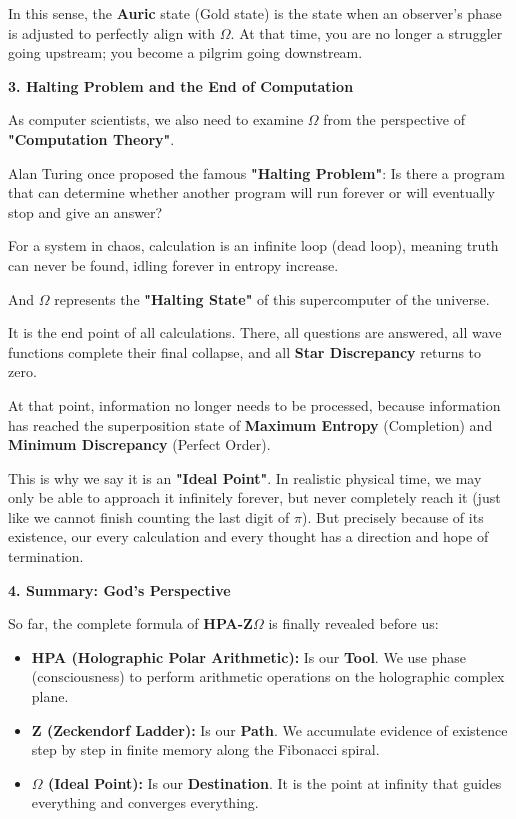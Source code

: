 In this sense, the \textbf{Auric} state (Gold state) is the state when an observer's phase is adjusted to perfectly align with \textbf{$\Omega$}. At that time, you are no longer a struggler going upstream; you become a pilgrim going downstream.

\textbf{3. Halting Problem and the End of Computation}

As computer scientists, we also need to examine \textbf{$\Omega$} from the perspective of \textbf{"Computation Theory"}.

Alan Turing once proposed the famous \textbf{"Halting Problem"}: Is there a program that can determine whether another program will run forever or will eventually stop and give an answer?

For a system in chaos, calculation is an infinite loop (dead loop), meaning truth can never be found, idling forever in entropy increase.

And \textbf{$\Omega$} represents the \textbf{"Halting State"} of this supercomputer of the universe.

It is the end point of all calculations. There, all questions are answered, all wave functions complete their final collapse, and all \textbf{Star Discrepancy} returns to zero.

At that point, information no longer needs to be processed, because information has reached the superposition state of \textbf{Maximum Entropy} (Completion) and \textbf{Minimum Discrepancy} (Perfect Order).

This is why we say it is an \textbf{"Ideal Point"}. In realistic physical time, we may only be able to approach it infinitely forever, but never completely reach it (just like we cannot finish counting the last digit of $\pi$). But precisely because of its existence, our every calculation and every thought has a direction and hope of termination.

\textbf{4. Summary: God's Perspective}

So far, the complete formula of \textbf{HPA-Z$\Omega$} is finally revealed before us:

\begin{itemize}
\item \textbf{HPA (Holographic Polar Arithmetic):} Is our \textbf{Tool}. We use phase (consciousness) to perform arithmetic operations on the holographic complex plane.
\item \textbf{Z (Zeckendorf Ladder):} Is our \textbf{Path}. We accumulate evidence of existence step by step in finite memory along the Fibonacci spiral.
\item \textbf{$\Omega$ (Ideal Point):} Is our \textbf{Destination}. It is the point at infinity that guides everything and converges everything.
\end{itemize}

